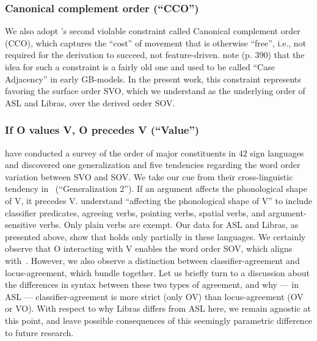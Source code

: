 \documentclass[output=paper,colorlinks,citecolor=brown,
]{langscibook}
\begin{document}
\subsubsection{Canonical complement order (``CCO'')}

We also adopt \citeauthor{Bobaljik.Wurmbrand.2012}'s second violable constraint called Canonical
complement order (CCO), which captures the “cost” of movement that
is otherwise “free”, i.e., not required for the derivation to succeed, not
feature-driven. \citeauthor{Bobaljik.Wurmbrand.2012} note (p. 390) that the idea for such a constraint is
a fairly old one and used to be called “Case Adjacency” in early
GB-models.
In the present work, this constraint represents favoring the surface
order SVO, which we understand as the underlying order of ASL and
Libras, over the derived order SOV.

\subsubsection{If O values V, O precedes V (``Value'')}

\citet{Napoli.SS.2014} have conducted a survey of the order
of major constituents in 42 sign languages and discovered one
generalization and five tendencies regarding the word order variation
between SVO and SOV. We take our cue from their cross-linguistic
tendency in~ (“Generalization 2”).
\ea 
    \label{lasz:ex:11}
    If an argument affects the phonological shape of V, it precedes V. 
    \citep{Napoli.SS.2014}
\z 
\citeauthor{Napoli.SS.2014} understand “affecting the phonological shape
of V” to include classifier predicates, agreeing verbs, pointing verbs,
spatial verbs, and argument-sensitive verbs. Only plain verbs are
exempt. Our data for ASL and Libras, as presented above, show that
 holds only partially in these languages. We certainly observe that
O interacting with V enables the word order SOV, which aligns with~. 
However, we also observe a distinction between
classifier-agreement and locus-agreement, which \citeauthor{Napoli.SS.2014} 
bundle together. Let us briefly turn to a discussion
about the differences in syntax between these two types of agreement,
and why --- in ASL --- classifier-agreement is more strict (only OV)
than locus-agreement (OV or VO). With respect to why Libras differs
from ASL here, we remain agnostic at this point, and leave possible
consequences of this seemingly parametric difference to future
research.
\end{document}
